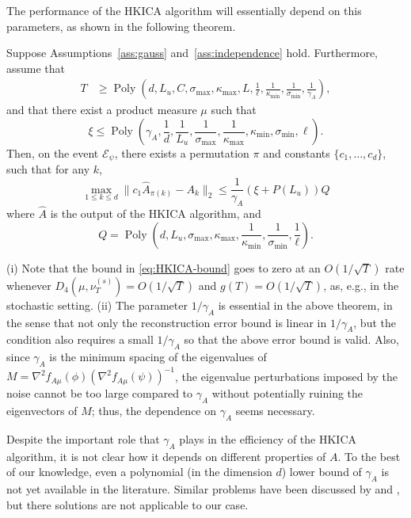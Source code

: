\documentclass[twoside,11pt]{article}
\newcommand{\Epsi}{\mathcal{E}_{\psi}}
\DeclareMathOperator{\pol}{Poly}
\newcommand{\poly}[1]{\pol\left(#1\right)}
\begin{document}
The performance of the HKICA algorithm will essentially depend on this parameters, as shown in the following theorem.
\begin{theorem}
\label{thm:efficiency} 
Suppose Assumptions~\ref{ass:gauss} and~\ref{ass:independence} hold. 
Furthermore, assume that
\begin{align*}
T & \ge \poly{d, L_u, C, \sigma_{\max},\kappa_{\max}, L,\frac{1}{\ell}, \frac{1}{\kappa_{\min}}, \frac{1}{\sigma_{\min}}, \frac{1}{\gamma_A}},
\end{align*}
and that there exist a product measure $\mu$ such that 
\[
\xi \le \poly{\gamma_A, \frac{1}{d}, \frac{1}{L_u}, \frac{1}{\sigma_{\max}}, \frac{1}{\kappa_{\max}}, \kappa_{\min}, \sigma_{\min}, \ell}.
\] 
Then, on the event $\Epsi$, there exists a permutation $\pi$ and constants $\{c_1,\ldots,c_d\}$, such that for any $k$,
\begin{equation}
\label{eq:HKICA-bound}
  \max_{1\le k\le d}\| c_1\hat{A}_{\pi(k)} - A_k\|_2 \le
  \frac{1}{\gamma_A} (\xi + P(L_u))Q
\end{equation}
where $\hat{A}$ is the output of the HKICA algorithm, and 
\[Q=\poly{d, L_u, \sigma_{\max}, \kappa_{\max}, \frac{1}{\kappa_{\min}}, \frac{1}{\sigma_{\min}}, \frac{1}{\ell}}.\]
\end{theorem}
\begin{remark}
(i) Note that the bound in \eqref{eq:HKICA-bound} goes to zero at an $O(1/\sqrt{T})$ rate whenever $D_4(\mu,\nu_T^{(s)})=O(1/\sqrt{T})$ and $g(T) = O(1/\sqrt{T})$, as, e.g., in the stochastic setting.
(ii) The parameter $1/\gamma_A$ is essential in the above theorem, in the sense that not only the reconstruction error bound is linear in $1/\gamma_A$, but the condition also requires a small $1/\gamma_A$ so that the above error bound is valid. 
Also, since $\gamma_A$ is the minimum spacing of the eigenvalues of $M=\nabla^2 f_{A\mu}(\phi) (\nabla^2 f_{A\mu}(\psi))^{-1}$, the eigenvalue perturbations imposed by the noise cannot be too large compared to $\gamma_A$ without potentially  ruining the eigenvectors of $M$; thus, the dependence on $\gamma_A$ seems necessary.
\end{remark}

Despite the important role that $\gamma_A$ plays in the efficiency of the HKICA algorithm, it is not clear how it depends on different properties of $A$.
To the best of our knowledge, even a polynomial (in the dimension $d$) lower bound of $\gamma_A$ is not yet available in the literature. 
Similar problems have been discussed by  \citet{husler1987minimal} and \citet{goyal2014fourier}, but there solutions are not applicable to our case.
\end{document}
